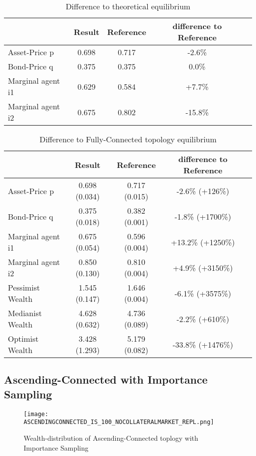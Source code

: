 \documentclass[Bachelorarbeit.tex]{subfiles}
\begin{document}
\begin{table}[H]
	\caption{Difference to theoretical equilibrium}
	\centering
	\begin{tabular} { l c c c r }
		& Result & Reference & difference to Reference \\
		\hline
		Asset-Price p & 0.698 & 0.717 & -2.6\% \\
		Bond-Price q & 0.375 & 0.375 & 0.0\% \\
		Marginal agent i1 & 0.629  & 0.584 & +7.7\% \\
		Marginal agent i2 & 0.675 & 0.802 & -15.8\% \\
		\hline
	\end{tabular}
\end{table}

\begin{table}[H]
	\caption{Difference to Fully-Connected topology equilibrium}
	\centering
	\begin{tabular} { l c c c r }
		& Result & Reference & difference to Reference \\
		\hline
		Asset-Price p & 0.698 (0.034) & 0.717 (0.015) & -2.6\% (+126\%) \\
		Bond-Price q & 0.375 (0.018) & 0.382 (0.001) & -1.8\% (+1700\%) \\
		Marginal agent i1 & 0.675 (0.054) & 0.596 (0.004) & +13.2\% (+1250\%) \\
		Marginal agent i2 & 0.850 (0.130) & 0.810 (0.004) & +4.9\% (+3150\%) \\
		\hline
		Pessimist Wealth & 1.545 (0.147) & 1.646 (0.004) & -6.1\% (+3575\%) \\
		Medianist Wealth & 4.628 (0.632) & 4.736 (0.089) & -2.2\% (+610\%) \\
		Optimist Wealth & 3.428 (1.293) & 5.179 (0.082) & -33.8\% (+1476\%) \\
		\hline
	\end{tabular}
\end{table}

\subsection{Ascending-Connected with Importance Sampling}
\begin{figure}[H]
	\centering
  \texttt{[image: ASCENDINGCONNECTED\_IS\_100\_NOCOLLATERALMARKET\_REPL.png]}
	\caption{Wealth-distribution of Ascending-Connected toplogy with Importance Sampling}
	\label{fig:wealth_ASCENDINGCONNECTED_IS_100_NOCOLLATERALMARKET_REPL}
\end{figure}
\end{document}

